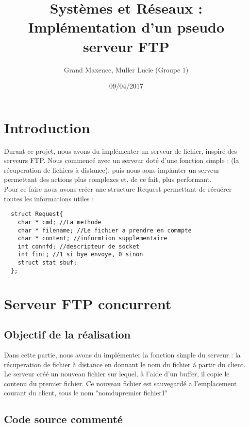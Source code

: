 \documentclass{report}
\author{Grand Maxence, Muller Lucie (Groupe 1) }
\title{Syst\`emes et R\'eseaux : Impl\'ementation d'un pseudo serveur FTP }
\date{09/04/2017}
\begin{document}
\maketitle
\tableofcontents

\chapter*{Introduction}
	Durant ce projet, nous avons du impl\'ementer un serveur de fichier, inspir\'e des serveurs FTP. Nous commenc\'e avec un serveur dot\'e
  d'une fonction simple : (la r\'ecuperation de fichiers \`a distance), puis nous aons implanter un serveur permettant des actions plus complexes et,
  de ce fait, plus performant.\\
  Pour ce faire nous avons cr\'eer une structure Request permettant de r\'ecu\'erer toutes les informations utiles :
  \begin{lstlisting}
  struct Request{
  	char * cmd; //La methode
  	char * filename; //Le fichier a prendre en commpte
  	char * content; //informtion supplementaire
  	int connfd; //descripteur de socket
  	int fini; //1 si bye envoye, 0 sinon
  	struct stat sbuf;
  };
  \end{lstlisting}
    \chapter{Serveur FTP concurrent}
      \section{Objectif de la r\'ealisation}
	Dans cette partie, nous avons du impl\'ementer la fonction simple du serveur : la r\'ecuperation de fichier \`a distance en donnant le nom du fichier \'a partir du client. Le serveur cr\'e\'e un nouveau fichier sur lequel, \`a l'aide d'un buffer, il copie le contenu du premier fichier. Ce nouveau fichier est sauvegard\'e a l'emplacement courant du client, sous le nom "nomdupremier fichier1"\\
      \section{Code source comment\'e}
\end{document}
